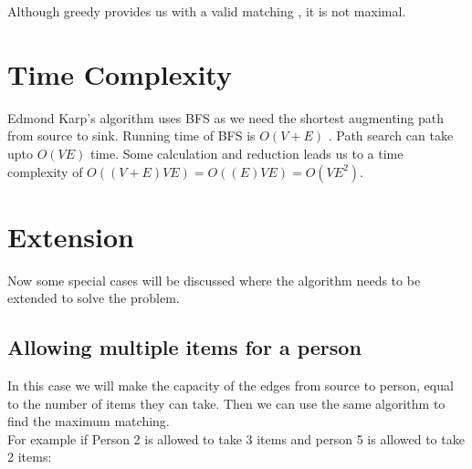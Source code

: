 \documentclass{article}
\begin{document}
Although greedy provides us with a valid matching , it is not maximal.

\section{Time Complexity}
Edmond Karp’s algorithm uses BFS as we need the shortest augmenting path from source to sink. Running time of BFS is $O(V + E)$ . Path search can take upto $O(V E)$ time. Some calculation and reduction leads us to a time complexity of $O((V+E)VE) = O((E)VE) = O(VE^{2})$.

\section{Extension}
Now some special cases will be discussed where the algorithm needs to be extended to solve the problem.

\subsection{Allowing multiple items for a person}
In this case we will make the capacity of the edges  from source to person, equal to the number of items they can take. Then we can use the same algorithm to find the maximum matching. \\
For example if Person 2 is allowed to take 3 items and person 5 is allowed to take 2 items:
\end{document}
